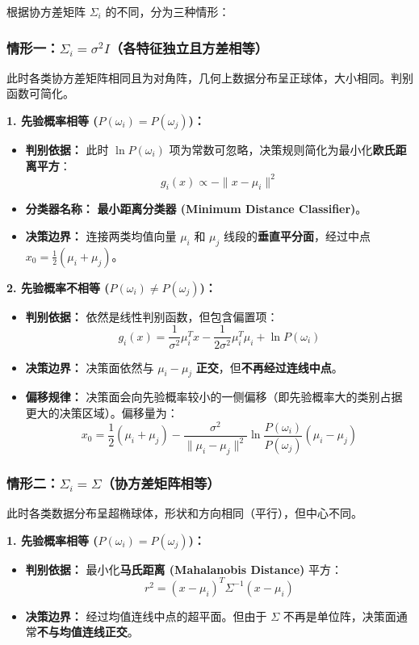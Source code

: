 \documentclass[a4paper, 11pt]{ctexart}
\begin{document}
根据协方差矩阵 $\Sigma_i$ 的不同，分为三种情形：

\subsubsection{情形一：$\Sigma_i = \sigma^2 I$（各特征独立且方差相等）}
此时各类协方差矩阵相同且为对角阵，几何上数据分布呈正球体，大小相同。判别函数可简化。

\textbf{1. 先验概率相等 ($P(\omega_i) = P(\omega_j)$)：}
\begin{itemize}
    \item \textbf{判别依据：} 此时 $\ln P(\omega_i)$ 项为常数可忽略，决策规则简化为最小化\textbf{欧氏距离平方}：
    \[ g_i(x) \propto -\|x - \mu_i\|^2 \]
    \item \textbf{分类器名称：} \textbf{最小距离分类器 (Minimum Distance Classifier)}。
    \item \textbf{决策边界：} 连接两类均值向量 $\mu_i$ 和 $\mu_j$ 线段的\textbf{垂直平分面}，经过中点 $x_0 = \frac{1}{2}(\mu_i + \mu_j)$。
\end{itemize}

\textbf{2. 先验概率不相等 ($P(\omega_i) \neq P(\omega_j)$)：}
\begin{itemize}
    \item \textbf{判别依据：} 依然是线性判别函数，但包含偏置项：
    \[ g_i(x) = \frac{1}{\sigma^2}\mu_i^T x - \frac{1}{2\sigma^2}\mu_i^T \mu_i + \ln P(\omega_i) \]
    \item \textbf{决策边界：} 决策面依然与 $\mu_i - \mu_j$ \textbf{正交}，但\textbf{不再经过连线中点}。
    \item \textbf{偏移规律：} 决策面会向先验概率较小的一侧偏移（即先验概率大的类别占据更大的决策区域）。偏移量为：
    \[ x_0 = \frac{1}{2}(\mu_i + \mu_j) - \frac{\sigma^2}{\|\mu_i - \mu_j\|^2} \ln \frac{P(\omega_i)}{P(\omega_j)} (\mu_i - \mu_j) \]
\end{itemize}

\subsubsection{情形二：$\Sigma_i = \Sigma$（协方差矩阵相等）}
此时各类数据分布呈超椭球体，形状和方向相同（平行），但中心不同。

\textbf{1. 先验概率相等 ($P(\omega_i) = P(\omega_j)$)：}
\begin{itemize}
    \item \textbf{判别依据：} 最小化\textbf{马氏距离 (Mahalanobis Distance)} 平方：
    \begin{equation}
        r^2 = (x-\mu_i)^T \Sigma^{-1} (x-\mu_i)
    \end{equation}
    \item \textbf{决策边界：} 经过均值连线中点的超平面。但由于 $\Sigma$ 不再是单位阵，决策面通常\textbf{不与均值连线正交}。
\end{itemize}
\end{document}
